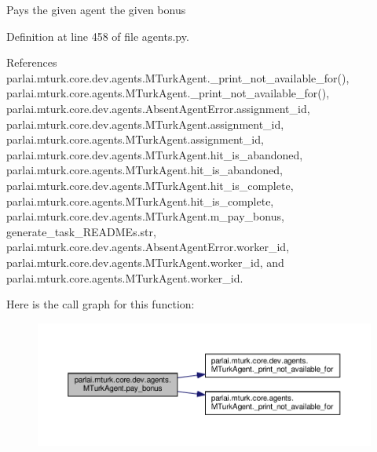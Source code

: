 \begin{DoxyVerb}Pays the given agent the given bonus\end{DoxyVerb}
 

Definition at line 458 of file agents.\+py.



References parlai.\+mturk.\+core.\+dev.\+agents.\+M\+Turk\+Agent.\+\_\+print\+\_\+not\+\_\+available\+\_\+for(), parlai.\+mturk.\+core.\+agents.\+M\+Turk\+Agent.\+\_\+print\+\_\+not\+\_\+available\+\_\+for(), parlai.\+mturk.\+core.\+dev.\+agents.\+Absent\+Agent\+Error.\+assignment\+\_\+id, parlai.\+mturk.\+core.\+dev.\+agents.\+M\+Turk\+Agent.\+assignment\+\_\+id, parlai.\+mturk.\+core.\+agents.\+M\+Turk\+Agent.\+assignment\+\_\+id, parlai.\+mturk.\+core.\+dev.\+agents.\+M\+Turk\+Agent.\+hit\+\_\+is\+\_\+abandoned, parlai.\+mturk.\+core.\+agents.\+M\+Turk\+Agent.\+hit\+\_\+is\+\_\+abandoned, parlai.\+mturk.\+core.\+dev.\+agents.\+M\+Turk\+Agent.\+hit\+\_\+is\+\_\+complete, parlai.\+mturk.\+core.\+agents.\+M\+Turk\+Agent.\+hit\+\_\+is\+\_\+complete, parlai.\+mturk.\+core.\+dev.\+agents.\+M\+Turk\+Agent.\+m\+\_\+pay\+\_\+bonus, generate\+\_\+task\+\_\+\+R\+E\+A\+D\+M\+Es.\+str, parlai.\+mturk.\+core.\+dev.\+agents.\+Absent\+Agent\+Error.\+worker\+\_\+id, parlai.\+mturk.\+core.\+dev.\+agents.\+M\+Turk\+Agent.\+worker\+\_\+id, and parlai.\+mturk.\+core.\+agents.\+M\+Turk\+Agent.\+worker\+\_\+id.

Here is the call graph for this function\+:
\nopagebreak
\begin{figure}[H]
\begin{center}
\leavevmode
\includegraphics[width=350pt]{classparlai_1_1mturk_1_1core_1_1dev_1_1agents_1_1MTurkAgent_a9171ff6eb3ff172868987fafba8f8efc_cgraph}
\end{center}
\end{figure}
\mbox{\label{classparlai_1_1mturk_1_1core_1_1dev_1_1agents_1_1MTurkAgent_a2cd8f8cbd48123595dd64371577f2a27}} 
